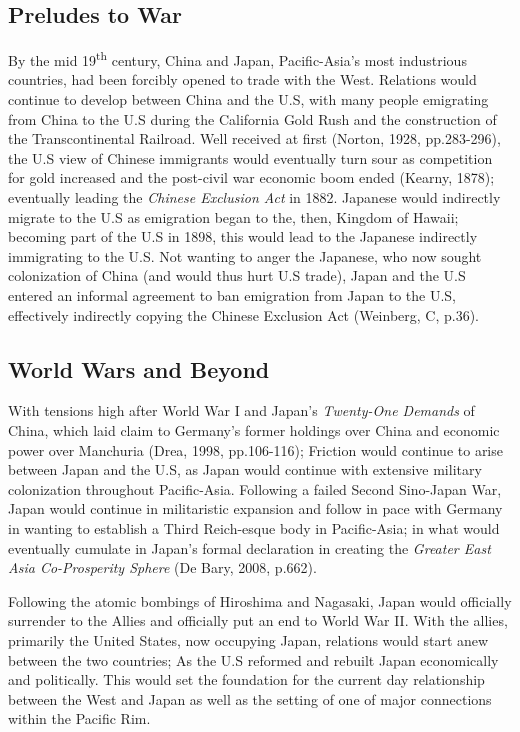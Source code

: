 \documentclass[man,donotrepeattitle,letter]{apa6}
\begin{document}
\subsection{Preludes to War}
By the mid 19\textsuperscript{th}  century, China and Japan, Pacific-Asia's most industrious countries, had been forcibly opened to trade with the West.  Relations would continue to develop between China and the U.S, with many people emigrating from China to the U.S during the California Gold Rush and the construction of the Transcontinental Railroad.  Well received at first (Norton, 1928, pp.283-296), the U.S view of Chinese immigrants would eventually turn sour as competition for gold increased and the post-civil war economic boom ended (Kearny, 1878); eventually leading the \textit{Chinese Exclusion Act} in 1882.  Japanese would indirectly migrate to the U.S as emigration began to the, then, Kingdom of Hawaii; becoming part of the U.S in 1898, this would lead to the Japanese indirectly immigrating to the U.S.  Not wanting to anger the Japanese, who now sought colonization of China (and would thus hurt U.S trade), Japan and the U.S entered an informal agreement to ban emigration from Japan to the U.S, effectively indirectly copying the Chinese Exclusion Act (Weinberg, C, p.36).

\subsection{World Wars and Beyond}
With tensions high after World War I and Japan's \textit{Twenty-One Demands} of China, which laid claim to Germany's former holdings over China and economic power over Manchuria (Drea, 1998, pp.106-116); Friction would continue to arise between Japan and the U.S, as Japan would continue with extensive military colonization throughout Pacific-Asia.  Following a failed Second Sino-Japan War, Japan would continue in militaristic expansion and follow in pace with Germany in wanting to establish a Third Reich-esque body in Pacific-Asia; in what would eventually cumulate in Japan's formal declaration in creating the \textit{Greater East Asia Co-Prosperity Sphere} (De Bary, 2008, p.662).

Following the atomic bombings of Hiroshima and Nagasaki, Japan would officially surrender to the Allies and officially put an end to World War II. With the allies, primarily the United States, now occupying Japan, relations would start anew between the two countries; As the U.S reformed and rebuilt Japan economically and politically.  This would set the foundation for the current day relationship between the West and Japan as well as the setting of one of major connections within the Pacific Rim.
\end{document}
